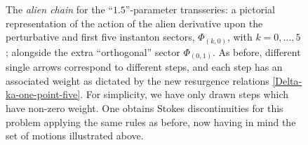 \documentclass[11pt,a4paper]{article}
\begin{document}
\begin{figure}[t!]
\begin{center}
\end{center}
\vspace*{-60pt}
\caption{The \textit{alien chain} for the ``$1.5$''-parameter transseries: a pictorial representation of the action of the alien derivative upon the perturbative and first five instanton sectors, $\Phi_{(k,0)}$, with $k=0,\ldots,5$; alongside the extra ``orthogonal'' sector $\Phi_{(0,1)}$. As before, different single arrows correspond to different steps, and each step has an associated weight as dictated by the new resurgence relations \eqref{Delta-ka-one-point-five}. For simplicity, we have only drawn steps which have non-zero weight. One obtains Stokes discontinuities for this problem applying the same rules as before, now having in mind the set of motions illustrated above.}
\label{fig:first-5-sector-alien-one-point-five}
\end{figure}
\end{document}
